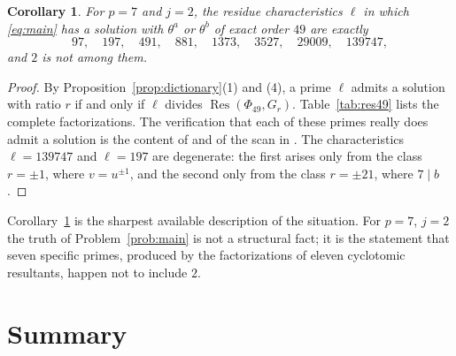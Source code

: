 \documentclass[a4paper]{article}
\newtheorem{corollary}[theorem]{Corollary}
\DeclareMathOperator{\Res}{Res}
\begin{document}
\begin{corollary}\label{cor:p7-complete}
	For $p=7$ and $j=2$, the residue characteristics $\ell$ in which
	\eqref{eq:main} has a solution with $\theta^{a}$ or $\theta^{b}$ of
	exact order $49$ are exactly
	\[
		97,\quad 197,\quad 491,\quad 881,\quad 1373,\quad 3527,\quad 29009,\quad 139747 ,
	\]
	and $2$ is not among them.
\end{corollary}

\begin{proof}
	By Proposition~\ref{prop:dictionary}(1) and (4), a prime $\ell$ admits
	a solution with ratio $r$ if and only if $\ell$ divides
	$\Res(\Phi_{49},G_r)$.
	Table~\ref{tab:res49} lists the complete factorizations.
	The verification that each of these primes really does admit a solution
	is the content of
	 and of the scan
	in .
	The characteristics $\ell=139747$ and $\ell=197$ are degenerate: the
	first arises only from the class $r=\pm1$, where $v=u^{\pm1}$, and the
	second only from the class $r=\pm21$, where $7\mid b$.
\end{proof}

Corollary~\ref{cor:p7-complete} is the sharpest available description of the
situation.
For $p=7$, $j=2$ the truth of Problem~\ref{prob:main} is not a structural
fact; it is the statement that seven specific primes, produced by the
factorizations of eleven cyclotomic resultants, happen not to include $2$.

\section{Summary}\label{sec:summary}
\end{document}
